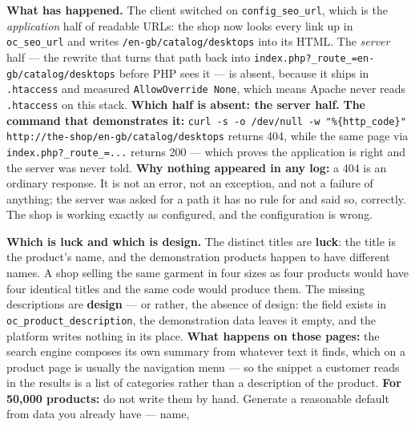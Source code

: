 \begin{ans}
  \item \textbf{What has happened.} The client switched on
        \texttt{config\_seo\_url}, which is the \emph{application} half of
        readable URLs: the shop now looks every link up in
        \texttt{oc\_seo\_url} and writes \texttt{/en-gb/catalog/desktops} into
        its HTML. The \emph{server} half --- the rewrite that turns that path
        back into \texttt{index.php?\_route\_=en-gb/catalog/desktops} before
        PHP sees it --- is absent, because it ships in \texttt{.htaccess} and
         measured \texttt{AllowOverride None}, which means
        Apache never reads \texttt{.htaccess} on this stack. \textbf{Which half
        is absent: the server half.} \textbf{The command that demonstrates it:}
        \texttt{curl -s -o /dev/null -w "\%\{http\_code\}"
        http://the-shop/en-gb/catalog/desktops} returns 404, while the same
        page via \texttt{index.php?\_route\_=...} returns 200 --- which proves
        the application is right and the server was never told.
        \textbf{Why nothing appeared in any log:} a 404 is an ordinary
        response. It is not an error, not an exception, and not a failure of
        anything; the server was asked for a path it has no rule for and said
        so, correctly. The shop is working exactly as configured, and the
        configuration is wrong.
  \item \textbf{Which is luck and which is design.} The distinct titles are
        \textbf{luck}: the title is the product's name, and the demonstration
        products happen to have different names. A shop selling the same
        garment in four sizes as four products would have four identical
        titles and the same code would produce them. The missing descriptions
        are \textbf{design} --- or rather, the absence of design: the field
        exists in \texttt{oc\_product\_description}, the demonstration data
        leaves it empty, and the platform writes nothing in its place.
        \textbf{What happens on those pages:} the search engine composes its
        own summary from whatever text it finds, which on a product page is
        usually the navigation menu --- so the snippet a customer reads in the
        results is a list of categories rather than a description of the
        product. \textbf{For 50{,}000 products:} do not write them by hand.
        Generate a reasonable default from data you already have --- name,

\end{ans}
